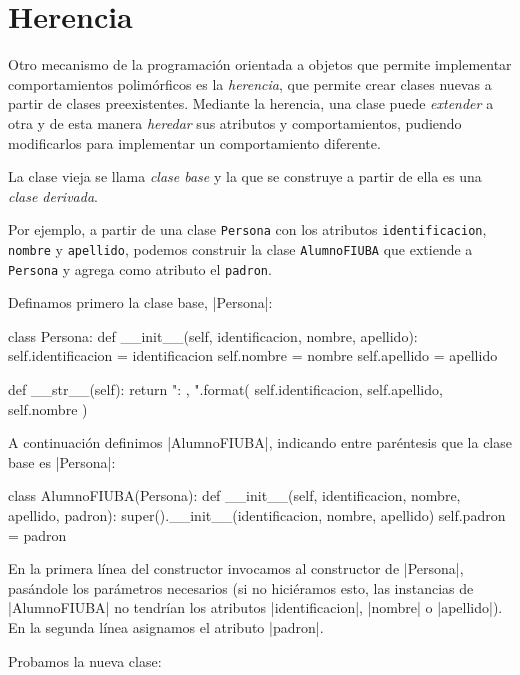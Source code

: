 \section{Herencia}

Otro mecanismo de la programación orientada a objetos que permite implementar
comportamientos polimórficos es la \emph{herencia}, que permite crear clases
nuevas a partir de clases preexistentes.  Mediante la herencia, una clase puede
\emph{extender} a otra y de esta manera \emph{heredar} sus atributos y
comportamientos, pudiendo modificarlos para implementar un comportamiento
diferente.

La clase vieja se llama \emph{clase base} y la que se construye a partir de
ella es una \emph{clase derivada}.

Por ejemplo, a partir de una clase \lstinline!Persona! con los atributos
\lstinline!identificacion!, \lstinline!nombre! y \lstinline!apellido!,
podemos construir la clase \lstinline!AlumnoFIUBA! que extiende a
\lstinline!Persona! y agrega como atributo el \lstinline!padron!.

Definamos primero la clase base, |Persona|:

\begin{codigo-python-sn}
class Persona:
    def __init__(self, identificacion, nombre, apellido):
        self.identificacion = identificacion
        self.nombre = nombre
        self.apellido = apellido

    def __str__(self):
        return "{}: {}, {}".format(
            self.identificacion, self.apellido, self.nombre
        )
\end{codigo-python-sn}

A continuación definimos |AlumnoFIUBA|, indicando entre paréntesis que la clase
base es |Persona|:

\begin{codigo-python-sn}
class AlumnoFIUBA(Persona):
    def __init__(self, identificacion, nombre, apellido, padron):
        super().__init__(identificacion, nombre, apellido)
        self.padron = padron
\end{codigo-python-sn}

En la primera línea del constructor invocamos al constructor de |Persona|,
pasándole los parámetros necesarios (si no hiciéramos esto, las instancias de
|AlumnoFIUBA| no tendrían los atributos |identificacion|, |nombre| o
|apellido|). En la segunda línea asignamos el atributo |padron|.

Probamos la nueva clase:

